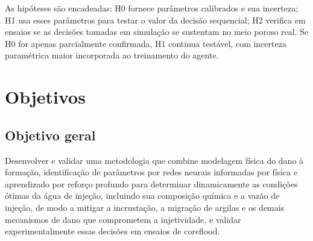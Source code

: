 \documentclass[11pt,a4paper]{article}
\newcommand{\itemedital}[1]{}
\begin{document}
As hipóteses são encadeadas: H0 fornece parâmetros calibrados e sua incerteza; H1 usa
esses parâmetros para testar o valor da decisão sequencial; H2 verifica em ensaios
se as decisões tomadas em simulação se sustentam no meio poroso real. Se H0 for apenas parcialmente confirmada, H1 continua
testável, com incerteza paramétrica maior incorporada ao treinamento do agente.

\section{Objetivos}\itemedital{2.16 XI}

\subsection{Objetivo geral}
Desenvolver e validar uma metodologia que combine modelagem física do dano à formação,
identificação de parâmetros por redes neurais informadas por física e aprendizado por
reforço profundo para determinar dinamicamente as condições ótimas da água de injeção,
incluindo sua composição química e a vazão de injeção, de modo a mitigar a incrustação, a
migração de argilas e os demais mecanismos de dano que comprometem a injetividade, e validar
experimentalmente essas decisões em ensaios de coreflood.
\end{document}
